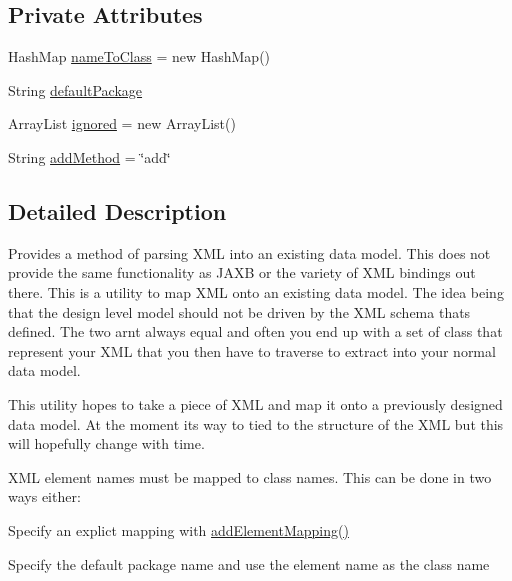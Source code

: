 \subsection*{Private Attributes}
\begin{DoxyCompactItemize}
\item 
Hash\+Map \mbox{\hyperlink{classorg_1_1newdawn_1_1slick_1_1util_1_1xml_1_1_object_tree_parser_ac81f61688951ebf234982da046b22dd9}{name\+To\+Class}} = new Hash\+Map()
\item 
String \mbox{\hyperlink{classorg_1_1newdawn_1_1slick_1_1util_1_1xml_1_1_object_tree_parser_ab71da775b688ffcb01dd17456a4013bb}{default\+Package}}
\item 
Array\+List \mbox{\hyperlink{classorg_1_1newdawn_1_1slick_1_1util_1_1xml_1_1_object_tree_parser_ac7fe7d041a44835a28a1f7effaf03410}{ignored}} = new Array\+List()
\item 
String \mbox{\hyperlink{classorg_1_1newdawn_1_1slick_1_1util_1_1xml_1_1_object_tree_parser_a063295dc4b123cde10949867045f71e6}{add\+Method}} = \char`\"{}add\char`\"{}
\end{DoxyCompactItemize}


\subsection{Detailed Description}
Provides a method of parsing X\+ML into an existing data model. This does not provide the same functionality as J\+A\+XB or the variety of X\+ML bindings out there. This is a utility to map X\+ML onto an existing data model. The idea being that the design level model should not be driven by the X\+ML schema thats defined. The two arn\textquotesingle{}t always equal and often you end up with a set of class that represent your X\+ML that you then have to traverse to extract into your normal data model.

This utility hopes to take a piece of X\+ML and map it onto a previously designed data model. At the moment it\textquotesingle{}s way to tied to the structure of the X\+ML but this will hopefully change with time.

X\+ML element names must be mapped to class names. This can be done in two ways either\+:


\begin{DoxyItemize}
\item Specify an explict mapping with \mbox{\hyperlink{classorg_1_1newdawn_1_1slick_1_1util_1_1xml_1_1_object_tree_parser_a03026019c9ab19b319fb0ef0ce32217e}{add\+Element\+Mapping()}}
\item Specify the default package name and use the element name as the class name
\end{DoxyItemize}

